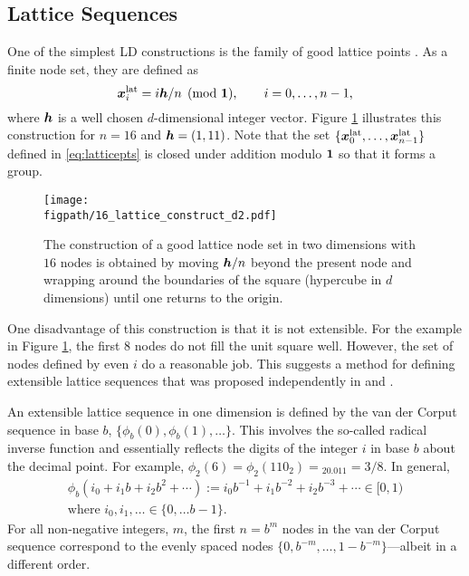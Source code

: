 \documentclass{svproc}
\newcommand{\figpath}{Figures}
\begin{document}
\subsection{Lattice Sequences} \label{sec:lattice}
One of the simplest LD constructions is the family of good lattice points \cite{DicEtal22a,SloJoe94}.  As a finite node set, they are defined as
\begin{equation} \label{eq:latticepts}
	{\boldsymbol{x}}_i^{\text{lat}} = i{\boldsymbol{h}}/n \pmod {{\boldsymbol{1}}}, \qquad i = 0, \ldots, n-1,
\end{equation}
where ${\boldsymbol{h}}$ is a well chosen $d$-dimensional integer vector. Figure \ref{fig:latticeconstruct} illustrates this construction for $n = 16$ and ${\boldsymbol{h}} = (1,11)$.  Note that the set $\{{\boldsymbol{x}}^{\text{lat}}_0, \ldots, {\boldsymbol{x}}^{\text{lat}}_{n-1}\}$ defined in \eqref{eq:latticepts} is closed under addition modulo ${\boldsymbol{1}}$ so that it forms a group.


\begin{figure}
	\centering
	\texttt{[image: \\figpath/16\_lattice\_construct\_d2.pdf]}
	\caption{The construction of a good lattice node set in two dimensions with $16$ nodes is obtained by moving ${\boldsymbol{h}}/n$ beyond the present node and wrapping around the boundaries of the square (hypercube in $d$ dimensions) until one returns to the origin. \label{fig:latticeconstruct}}
\end{figure}


One disadvantage of this construction is that it is not extensible. For the example in Figure \ref{fig:latticeconstruct}, the first $8$ nodes do not fill the unit square well.  However, the set of nodes defined by even $i$ do a reasonable job.  This suggests a method for defining extensible lattice sequences that was proposed independently in \cite{Mai81a} and \cite{HicEtal00}.

An extensible lattice sequence in one dimension is defined by the van der Corput sequence in base $b$, $\{\phi_b(0), \phi_b(1), \ldots\}$. This involves the so-called radical inverse function and essentially reflects the digits of the integer $i$ in base $b$ about the decimal point. For example, $\phi_2(6) = \phi_2(110_{2}) = {}_20.011 = 3/8$.  In general,
\begin{multline} \label{eq:vdc}
	\phi_b(i_0 + i_1b + i_2 b^2 + \cdots ) := i_0 b^{-1} + i_1 b^{-2} + i_2 b^{-3} + \cdots \in [0,1)
	\\
	 \text{where } i_0, i_1, \ldots \in \{0,\ldots b-1\}.
\end{multline}
For all non-negative integers, $m$, the first $n = b^m$ nodes in the van der Corput sequence correspond to the evenly spaced nodes $\{0, b^{-m}, \ldots, 1 - b^{-m} \}$---albeit in a different order.
\end{document}
